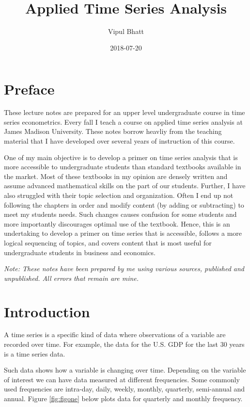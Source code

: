 \documentclass[]{book}
\title{Applied Time Series Analysis}
\author{Vipul Bhatt}
\date{2018-07-20}
\theoremstyle{definition}
\theoremstyle{definition}
\theoremstyle{definition}
\theoremstyle{remark}
\begin{document}
\maketitle

{
\setcounter{tocdepth}{1}
\tableofcontents
}
\chapter*{Preface}\label{preface}

These lecture notes are prepared for an upper level undergraduate course
in time series econometrics. Every fall I teach a course on applied time
series analysis at James Madison University. These notes borrow heavliy
from the teaching material that I have developed over several years of
instruction of this course.

One of my main objective is to develop a primer on time series analysis
that is more accessible to undergraduate students than standard
textbooks available in the market. Most of these textbooks in my opinion
are densely written and assume advanced mathematical skills on the part
of our students. Further, I have also struggled with their topic
selection and organization. Often I end up not following the chapters in
order and modify content (by adding or subtracting) to meet my students
needs. Such changes causes confusion for some students and more
importantly discourages optimal use of the textbook. Hence, this is an
undertaking to develop a primer on time series that is accessible,
follows a more logical sequencing of topics, and covers content that is
most useful for undergraduate students in business and economics.

\emph{Note: These notes have been prepared by me using various sources,
published and unpublished. All errors that remain are mine.}

\chapter{Introduction}\label{intro}

A time series is a specific kind of data where observations of a
variable are recorded over time. For example, the data for the U.S. GDP
for the last 30 years is a time series data.

Such data shows how a variable is changing over time. Depending on the
variable of interest we can have data measured at different frequencies.
Some commonly used frequencies are intra-day, daily, weekly, monthly,
quarterly, semi-annual and annual. Figure \ref{fig:figone} below plots
data for quarterly and monthly frequency.
\end{document}

